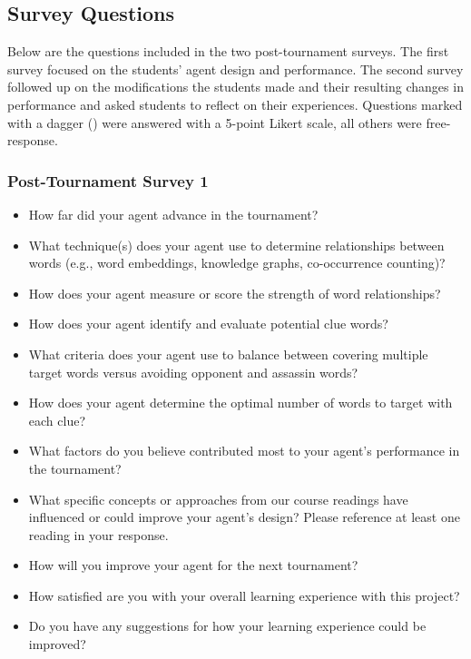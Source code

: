 \documentclass[phd,electronic,oneside,twosidetoc,letterpaper,chaptercenter,parttop,lof]{byumsphd}
\begin{document}
\subsection{Survey Questions}
Below are the questions included in the two post-tournament surveys. The first survey focused on the students' agent design and performance. The second survey followed up on the modifications the students made and their resulting changes in performance and asked students to reflect on their experiences. Questions marked with a dagger (\textdagger) were answered with a 5-point Likert scale, all others were free-response.

\subsubsection{Post-Tournament Survey 1}
\begin{itemize}
    \item How far did your agent advance in the tournament?
    \item What technique(s) does your agent use to determine relationships between words (e.g., word embeddings, knowledge graphs, co-occurrence counting)?
    \item How does your agent measure or score the strength of word relationships?
    \item How does your agent identify and evaluate potential clue words?
    \item What criteria does your agent use to balance between covering multiple target words versus avoiding opponent and assassin words?
    \item How does your agent determine the optimal number of words to target with each clue?
    \item What factors do you believe contributed most to your agent's performance in the tournament?
    \item What specific concepts or approaches from our course readings have influenced or could improve your agent's design? Please reference at least one reading in your response.
    \item How will you improve your agent for the next tournament?
    \item How satisfied are you with your overall learning experience with this project?\textdagger
    \item Do you have any suggestions for how your learning experience could be improved?
\end{itemize}
\end{document}
